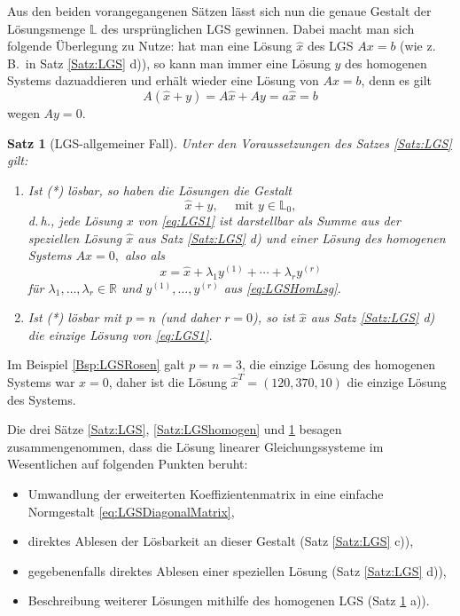 \documentclass[a4paper,11pt,oneside]{article}
\newtheorem{theorem}{Satz}
\theoremstyle{definition}
\begin{document}
Aus den beiden vorangegangenen Sätzen lässt sich nun die genaue Gestalt der Lösungsmenge $\mathbb L$ des ursprünglichen LGS gewinnen. Dabei macht man sich folgende Überlegung zu Nutze: hat man eine Lösung $\hat{x}$ des LGS $Ax=b$ (wie z.\,B.\ in Satz \ref{Satz:LGS} d)), so kann man immer eine Lösung $y$ des homogenen Systems dazuaddieren und erhält wieder eine Lösung von $Ax=b$, denn es gilt
\begin{equation}\label{eq:zusgLsg}
A(\hat{x}+y)= A\hat{x}+Ay=a\hat{x}=b
\end{equation}
wegen $Ay=0$.

\begin{theorem}[LGS-allgemeiner Fall]\label{Satz:LGSallg}
Unter den Voraussetzungen des Satzes \ref{Satz:LGS} gilt:
\begin{enumerate}
\item
Ist (*) lösbar, so haben die Lösungen die Gestalt
$$
{\hat x}+y,\quad \text{ mit } y \in {\mathbb L}_0,
$$
d.\,h., jede Lösung $x$ von \eqref{eq:LGS1} ist darstellbar als Summe aus der speziellen Lösung ${\hat x}$ aus Satz \ref{Satz:LGS} d) und einer Lösung des homogenen Systems $ Ax=0,$ also als
\begin{equation}\label{eq:LGSalgLsg}
x = \hat{x} + \lambda_1 y^{(1)}+\cdots + \lambda_r y^{(r)}
\end{equation}
für $\lambda_1,\ldots, \lambda_r\in\mathbb R$ und $y^{(1)},\ldots, y^{(r)}$ aus \eqref{eq:LGSHomLsg}.
\item
Ist (*) lösbar mit $p=n$ (und daher $r=0$), so ist ${\hat x}$ aus Satz \ref{Satz:LGS} d) die einzige Lösung von \eqref{eq:LGS1}.
\end{enumerate}
\end{theorem}

Im Beispiel \ref{Bsp:LGSRosen} galt $p=n=3$, die einzige Lösung des homogenen Systems war $x=0$, daher ist die Lösung $ \hat{x}^T=(120,370,10)$ die einzige Lösung des Systems.

Die drei Sätze \ref{Satz:LGS}, \ref{Satz:LGShomogen} und \ref{Satz:LGSallg} besagen zusammengenommen, dass die Lösung linearer Gleichungssysteme im
Wesentlichen auf folgenden Punkten beruht:
\begin{itemize}
\item
Umwandlung der erweiterten Koeffizientenmatrix in eine einfache Normgestalt \eqref{eq:LGSDiagonalMatrix},
\item
direktes Ablesen der Lösbarkeit an dieser Gestalt (Satz \ref{Satz:LGS} c)),
\item
gegebenenfalls direktes Ablesen einer speziellen Lösung (Satz \ref{Satz:LGS} d)),
\item
Beschreibung weiterer Lösungen mithilfe des homogenen LGS (Satz \ref{Satz:LGSallg} a)).
\end{itemize}
\end{document}

